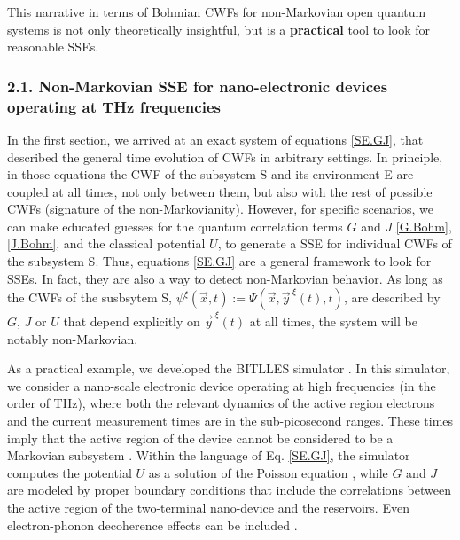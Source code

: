 \documentclass[11pt, a4paper]{article} %
\begin{document}
This narrative in terms of Bohmian CWFs for non-Markovian open quantum systems is not only theoretically insightful, but is a {\bf practical} tool to look for reasonable SSEs. 

\subsubsection*{2.1. Non-Markovian SSE for nano-electronic devices operating at THz frequencies}\vspace{-0.2cm}
In the first section, we arrived at an exact system of equations \eqref{SE.GJ}, that described the general time evolution of CWFs in arbitrary settings. In principle, in those equations the CWF of the subsystem S and its environment E are coupled at all times, not only between them, but also with the rest of possible CWFs (signature of the non-Markovianity). However, for specific scenarios, we can make educated guesses for the quantum correlation terms $G$ and $J$ \eqref{G.Bohm},\eqref{J.Bohm}, and the classical potential $U$, to generate a SSE for individual CWFs of the subsystem S. Thus, equations \eqref{SE.GJ} are a general framework to look for SSEs. In fact, they are also a way to detect non-Markovian behavior. As long as the CWFs of the susbsytem S, $\psi^\xi(\vec{x},t):=\Psi(\vec{x},\vec{y}^{\:\xi}(t),t)$, are described by $G$, $J$ or $U$ that depend explicitly on $\vec{y}^{\:\xi}(t)$ at all times, the system will be notably non-Markovian.

As a practical example, we developed the BITLLES simulator \cite{tdp,Pois,Thz}. In this simulator, we consider a nano-scale electronic device operating at high frequencies (in the order of THz), where both the relevant dynamics of the active region electrons and the current measurement times are in the sub-picosecond ranges. These times imply that the active region of the device cannot be considered to be a Markovian subsystem \cite{Thz}. Within the language of Eq. \eqref{SE.GJ}, the simulator computes the potential $U$ as a solution of the Poisson equation \cite{Pois}, while $G$ and $J$ are modeled by proper boundary conditions \cite{boundary1, Pois} that include the correlations between the active region of the two-terminal nano-device and the reservoirs. Even electron-phonon decoherence effects can be included \cite{eph}.
\end{document}
